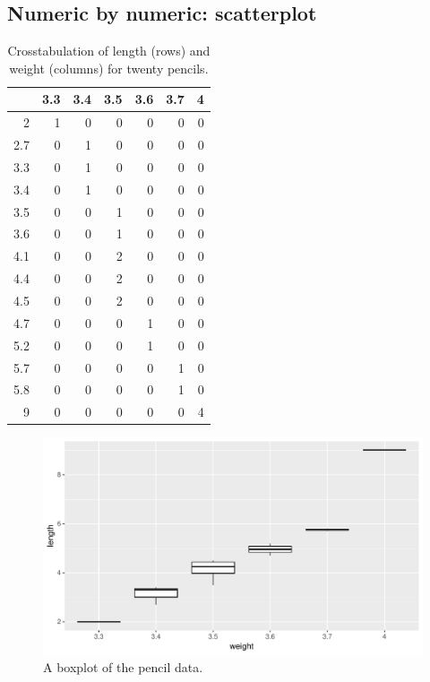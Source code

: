 \documentclass[]{report}\usepackage[]{graphicx}\usepackage[]{color}
\makeatletter
\def\maxwidth{ %
  \ifdim\Gin@nat@width>\linewidth
    \linewidth
  \else
    \Gin@nat@width
  \fi
}
\makeatother
\begin{document}
\subsection{Numeric by numeric: scatterplot}

\begin{table}[ht]
\centering
\caption{Crosstabulation of length (rows) and weight (columns) for twenty pencils.} 
\label{tab:crosstable_4}
\begin{tabular}{rrrrrrr}
  \hline
 & 3.3 & 3.4 & 3.5 & 3.6 & 3.7 & 4 \\ 
  \hline
2 &   1 &   0 &   0 &   0 &   0 &   0 \\ 
  2.7 &   0 &   1 &   0 &   0 &   0 &   0 \\ 
  3.3 &   0 &   1 &   0 &   0 &   0 &   0 \\ 
  3.4 &   0 &   1 &   0 &   0 &   0 &   0 \\ 
  3.5 &   0 &   0 &   1 &   0 &   0 &   0 \\ 
  3.6 &   0 &   0 &   1 &   0 &   0 &   0 \\ 
  4.1 &   0 &   0 &   2 &   0 &   0 &   0 \\ 
  4.4 &   0 &   0 &   2 &   0 &   0 &   0 \\ 
  4.5 &   0 &   0 &   2 &   0 &   0 &   0 \\ 
  4.7 &   0 &   0 &   0 &   1 &   0 &   0 \\ 
  5.2 &   0 &   0 &   0 &   1 &   0 &   0 \\ 
  5.7 &   0 &   0 &   0 &   0 &   1 &   0 \\ 
  5.8 &   0 &   0 &   0 &   0 &   1 &   0 \\ 
  9 &   0 &   0 &   0 &   0 &   0 &   4 \\ 
   \hline
\end{tabular}
\end{table}



\begin{figure}

{\centering \includegraphics[width=\maxwidth]{figure/crosstable_5-1} 

}

\caption[A boxplot of the pencil data]{A boxplot of the pencil data.}\label{fig:crosstable_5}
\end{figure}
\end{document}

